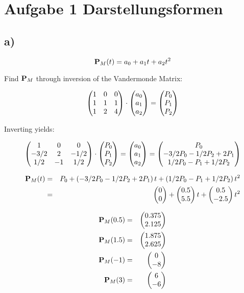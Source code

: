 
\section{Aufgabe 1 Darstellungsformen}

\subsection*{a)}


\begin{equation}
    {\bf P}_M(t) = a_0 + a_1 t + a_2 t^2
\end{equation}

Find ${\bf P}_M$ through inversion of the Vandermonde Matrix:

\begin{equation}
    \left( \begin{matrix}1 & 0 & 0 \\ 1 & 1 & 1 \\ 1 & 2 & 4\end{matrix}\right) \cdot \left( \begin{matrix}a_0 \\ a_1 \\ a_2\end{matrix}\right) = \left( \begin{matrix}P_0 \\ P_1 \\ P_2\end{matrix}\right)
\end{equation}

Inverting yields:

\begin{equation}
    \left( \begin{matrix}1 & 0 & 0 \\ -3/2 & 2  & -1/2  \\ 1/2 & -1 & 1/2\end{matrix}\right) \cdot \left( \begin{matrix}P_0 \\ P_1 \\ P_2\end{matrix}\right) = \left( \begin{matrix}a_0 \\ a_1 \\ a_2\end{matrix}\right) 
    = \left( \begin{matrix}P_0 \\ -3/2 P_0 - 1/2 P_2 + 2 P_1 \\ 1/2 P_0 - P_1 + 1/2 P_2\end{matrix}\right)
\end{equation}


\begin{eqnarray}
     {\bf P}_M(t) &=&  P_0  + \left( -3/2 P_0 - 1/2 P_2 + 2 P_1 \right) t + \left( 1/2 P_0 - P_1 + 1/2 P_2 \right) t^2 \\
&=& \left( \begin{matrix}0 \\0\end{matrix}\right) + \left( \begin{matrix}0.5 \\ 5.5 \end{matrix}\right) t   + \left( \begin{matrix}0.5 \\ - 2.5 \end{matrix}\right) t^2 
\end{eqnarray}

\begin{eqnarray}
    {\bf P}_M(0.5) &=& \left( \begin{matrix}0.375 \\ 2.125\end{matrix}\right) \\
    {\bf P}_M(1.5) &=& \left( \begin{matrix}1.875 \\ 2.625\end{matrix}\right) \\
    {\bf P}_M(-1) &=& \left( \begin{matrix}0 \\ -8\end{matrix}\right) \\
    {\bf P}_M(3) &=& \left( \begin{matrix}6 \\ -6\end{matrix}\right) 
\end{eqnarray}


